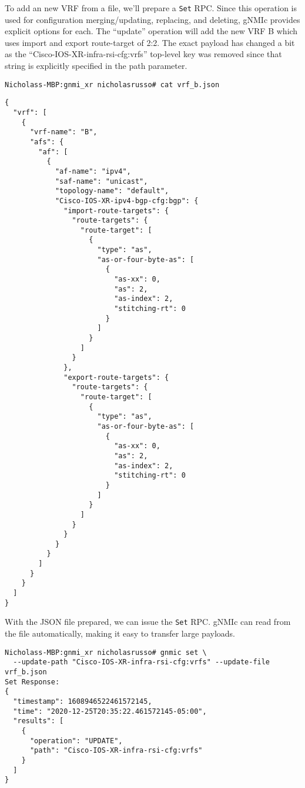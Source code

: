To add an new VRF from a file, we'll prepare a \verb|Set| RPC\@. Since this
operation is used for configuration merging/updating, replacing, and deleting,
gNMIc provides explicit options for each. The ``update'' operation will add the
new VRF B which uses import and export route-target of 2:2. The exact payload
has changed a bit as the ``Cisco-IOS-XR-infra-rsi-cfg:vrfs'' top-level key was
removed since that string is explicitly specified in the path parameter.

\begin{verbatim}
Nicholass-MBP:gnmi_xr nicholasrusso# cat vrf_b.json
\end{verbatim}

\begin{verbatim}
{
  "vrf": [
    {
      "vrf-name": "B",
      "afs": {
        "af": [
          {
            "af-name": "ipv4",
            "saf-name": "unicast",
            "topology-name": "default",
            "Cisco-IOS-XR-ipv4-bgp-cfg:bgp": {
              "import-route-targets": {
                "route-targets": {
                  "route-target": [
                    {
                      "type": "as",
                      "as-or-four-byte-as": [
                        {
                          "as-xx": 0,
                          "as": 2,
                          "as-index": 2,
                          "stitching-rt": 0
                        }
                      ]
                    }
                  ]
                }
              },
              "export-route-targets": {
                "route-targets": {
                  "route-target": [
                    {
                      "type": "as",
                      "as-or-four-byte-as": [
                        {
                          "as-xx": 0,
                          "as": 2,
                          "as-index": 2,
                          "stitching-rt": 0
                        }
                      ]
                    }
                  ]
                }
              }
            }
          }
        ]
      }
    }
  ]
}
\end{verbatim}

With the JSON file prepared, we can issue the \verb|Set| RPC\@. gNMIc can read
from the file automatically, making it easy to transfer large payloads.

\begin{verbatim}
Nicholass-MBP:gnmi_xr nicholasrusso# gnmic set \
  --update-path "Cisco-IOS-XR-infra-rsi-cfg:vrfs" --update-file vrf_b.json
Set Response:
{
  "timestamp": 1608946522461572145,
  "time": "2020-12-25T20:35:22.461572145-05:00",
  "results": [
    {
      "operation": "UPDATE",
      "path": "Cisco-IOS-XR-infra-rsi-cfg:vrfs"
    }
  ]
}
\end{verbatim}

